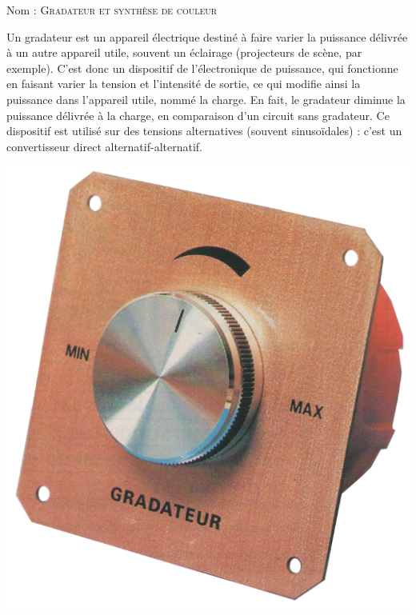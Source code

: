 \documentclass[a4paper, 11pt]{article}           %
\newcommand{\objectif}[1]{\textsc{\Huge #1} }
\begin{document}
\sffamily
\hfill Nom : {\noindent\makebox[5cm]{\dotfill}\endgraf}
\objectif{Gradateur et synthèse de couleur}\\ %

\begin{minipage}{0.46\textwidth}
Un gradateur est un appareil électrique destiné à faire varier la puissance délivrée à un autre appareil utile, souvent un éclairage (projecteurs de scène, par exemple). C'est donc un dispositif de l'électronique de puissance, qui fonctionne en faisant varier la tension et l'intensité de sortie, ce qui modifie ainsi la puissance dans l'appareil utile, nommé la charge. En fait, le gradateur diminue la puissance délivrée à la charge, en comparaison d'un circuit sans gradateur. Ce dispositif est utilisé sur des tensions alternatives (souvent sinusoïdales) : c'est un convertisseur direct alternatif-alternatif. \\
\end{minipage}\hfill
\begin{minipage}{0.46\textwidth}
\begin{center}
\includegraphics[width=\textwidth]{Gradateur_lumiere_mural}
\end{center}
\end{minipage}
\end{document}
